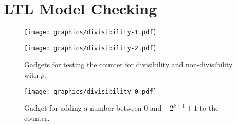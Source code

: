 \documentclass{llncs}
\begin{document}
\section{LTL Model Checking}
\begin{figure}
  \begin{center}
    \texttt{[image: graphics/divisibility-1.pdf]}
  \end{center}
  \begin{center}
    \texttt{[image: graphics/divisibility-2.pdf]}
  \end{center}
  \caption{Gadgets for testing the counter for divisibility and
    non-divisibility with $p$.}
  \label{fig:divisibility-gadgets}
\end{figure}
\begin{figure}
  \begin{center}
    \texttt{[image: graphics/divisibility-0.pdf]}
  \end{center}
  \caption{Gadget for adding a number between $0$ and $-2^{k+1}+1$ to
    the counter.}
  \label{fig:number-diamond}
\end{figure}
\end{document}

